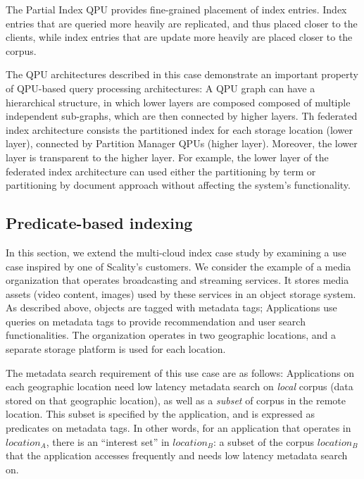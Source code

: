 The Partial Index QPU provides fine-grained placement of index entries.
Index entries that are queried more heavily are replicated, and thus placed closer to the clients,
while index entries that are update more heavily are placed closer to the corpus.

\medskip
\noindent
The QPU architectures described in this case demonstrate an important property of QPU-based query processing architectures:
A QPU graph can have a hierarchical structure,
in which lower layers are composed composed of multiple independent sub-graphs,
which are then connected by higher layers.
Th federated index architecture consists the partitioned index for each storage location (lower layer),
connected by Partition Manager QPUs (higher layer).
Moreover, the lower layer is transparent to the higher layer.
For example, the lower layer of the federated index architecture can used either the partitioning by term or
partitioning by document approach without affecting the system's functionality.

\subsection{Predicate-based indexing}

In this section, we extend the multi-cloud index case study by examining a use case inspired by one of Scality's customers.
We consider the example of a media organization that operates broadcasting and streaming services.
It stores media assets (video content, images) used by these services in an object storage system.
As described above, objects are tagged with metadata tags;
Applications use queries on metadata tags to provide recommendation and user search functionalities.
The organization operates in two geographic locations, and a separate storage platform is used for each location.

The metadata search requirement of this use case are as follows:
Applications on each geographic location need low latency metadata search on \textit{local} corpus (data stored on that geographic location),
as well as a \textit{subset} of corpus in the remote location.
This subset is specified by the application, and is expressed as predicates on metadata tags.
In other words, for an application that operates in $location_A$, there is an ``interest set'' in $location_B$:
a subset of the corpus $location_B$ that the application accesses frequently and needs low latency metadata search on.

